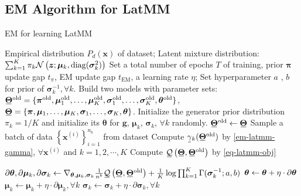 \subsection{EM Algorithm for LatMM}
\begin{algorithm}[t]
  \caption{EM for learning LatMM}\label{flow-algo-sem}
  \begin{algorithmic}[1]
     Empirical distribution $P_d(\bm{x})$ of dataset;
    \STATE Latent mixture distribution: 
    \STATE $\sum_{k=1}^{K}\pi_k \mathcal{N}\left(\bm{z}; \bm{\mu}_k, \mathrm{diag}(\bm{\sigma}_k^2)\right)$
    \STATE Set a total number of epochs $T$ of training, prior $\bm{\pi}$ update gap $t_{\pi}$, EM update gap $t_{\mathrm{EM}}$, a learning rate $\eta$; Set hyperparameter $a$ , $b$ for prior of
    $\bm{\sigma}_k^{-1}, \forall k$.
    \STATE Build two models with parameter sets:
    \STATE $\ubar{\bm{\Theta}}^{\mathrm{old}}=\{ \bm{\pi}^{\mathrm{old}},
    \bm{\mu}_1^{\mathrm{old}},\hdots, \bm{\mu}_K^{\mathrm{old}}, \bm{\sigma}_1^{\mathrm{old}},\hdots,
    \bm{\sigma}_K^{\mathrm{old}}, \bm{\theta}^{\mathrm{old}} \}$,
    \STATE $\ubar{\bm{\Theta}} = \{ \bm{\pi},
    \bm{\mu}_1,\hdots, \bm{\mu}_K, \bm{\sigma}_1,\hdots,
    \bm{\sigma}_K, \bm{\theta} \}$.
    \STATE Initialize the generator prior distribution $\pi_k = 1/K$ and initialize its $\bm{\theta}$ for $\bm{g}$, $\bm{\mu}_k$, $\bm{\sigma}_k$, $\forall k$ randomly.
    \STATE $\ubar{\bm{\Theta}}^{\mathrm{old}} \gets \ubar{\bm{\Theta}}$
    \STATE Sample a batch of data $\left\{ \bm{x}^{(i)}
    \right\}_{i=1}^{n_b}$ from dataset
    \STATE Compute $\ubar{\gamma}_k(\ubar{\bm{\Theta}}^{\mathrm{old}})$ by \eqref{em-latmm-gamma}, $\forall \bm{x}^{(i)}$ and $k=1, 2, \cdots, K$ %
    \STATE Compute
    $\ubar{\Qq}\left(\ubar{\bm{\Theta}},\ubar{\bm{\Theta}}^{\mathrm{old}}\right)$ by \eqref{eq-latmm-obj}%

    \STATE $\partial{\bm{\th}}, \partial{\bm{\mu}_k}, \partial{\bm{\sigma}_k}\gets 
    \nabla_{\bm{\theta}, \bm{\mu}_k, \bm{\sigma}_k} 
    \frac{1}{n^{b}}\ubar{\Qq}\left(\ubar{\bm{\Theta}},\ubar{\bm{\Theta}}^{\mathrm{old}}\right)
    +\frac{1}{K}
    \log\prod_{k=1}^K
    \Gamma(\bm{\sigma}_k^{-1};
    a, b)$ %
    \STATE $\bm{\theta} \gets \bm{\theta} + \eta \cdot \partial{\bm{\theta}}$
    \STATE $\bm{\mu}_k \gets \bm{\mu}_k + \eta \cdot \partial{\bm{\mu}_k}, \forall k$
    \STATE $\bm{\sigma}_k \gets \bm{\sigma}_k + \eta \cdot \partial{\bm{\sigma}_k},
    \forall k$
    \ENDFOR


\end{algorithmic}
\end{algorithm}
